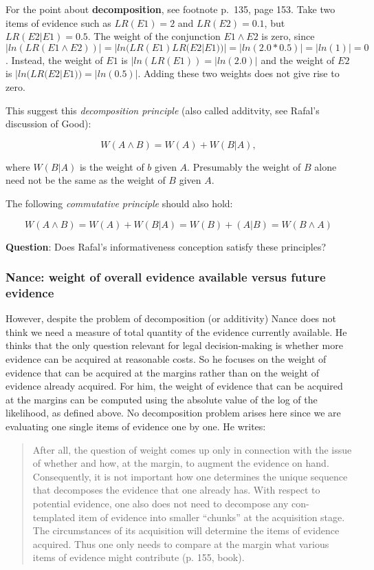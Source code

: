 \documentclass[
  10pt,
  dvipsnames,enabledeprecatedfontcommands]{scrartcl}
\begin{document}
For the point about \textbf{decomposition}, see footnote p.~135, page
153. Take two items of evidence such as \(LR(E1)=2\) and \(LR(E2)=0.1\),
but \(LR(E2 | E1)=0.5\). The weight of the conjunction \(E1 \wedge E2\)
is zero, since
\(|ln(LR(E1 \wedge E2))|=|ln(LR(E1)LR(E2| E1))|=|ln(2.0*0.5)|=|ln(1)|=0\).
Instead, the weight of \(E1\) is \(|ln(LR(E1))=|ln(2.0)|\) and the
weight of \(E2\) is \(|ln(LR(E2|E1))=|ln(0.5)|\). Adding these two
weights does not give rise to zero.

This suggest this \textit{decomposition principle} (also called
additvity, see Rafal's discussion of Good):

\[W(A \wedge B) = W(A) + W(B | A),\]

where \(W(B | A)\) is the weight of \(b\) given \(A\). Presumably the
weight of \(B\) alone need not be the same as the weight of \(B\) given
\(A\).

The following \textit{commutative principle} should also hold:

\[W(A \wedge B) = W(A) + W(B | A)= W(B) + (A | B) = W(B \wedge A)\]

\textbf{Question}: Does Rafal's informativeness conception satisfy these
principles?

\hypertarget{nance-weight-of-overall-evidence-available-versus-future-evidence}{%
\subsubsection{Nance: weight of overall evidence available versus future
evidence}\label{nance-weight-of-overall-evidence-available-versus-future-evidence}}

However, despite the problem of decomposition (or additivity) Nance does
not think we need a measure of total quantity of the evidence currently
available. He thinks that the only question relevant for legal
decision-making is whether more evidence can be acquired at reasonable
costs. So he focuses on the weight of evidence that can be acquired at
the margins rather than on the weight of evidence already acquired. For
him, the weight of evidence that can be acquired at the margins can be
computed using the absolute value of the log of the likelihood, as
defined above. No decomposition problem arises here since we are
evaluating one single items of evidence one by one. He writes:

\begin{quote}
After all, the question of weight comes up only in connection with the issue of whether and how, at the margin, to augment the evidence on hand. Consequently, it is not important how one determines the unique sequence that decomposes the evidence that one already has. With respect to potential evidence, one also does not need to decompose any con- templated item of evidence into smaller “chunks” at the acquisition stage. The circumstances of its acquisition will determine the items of evidence acquired. Thus one only needs to compare at the margin what various items of evidence might contribute (p. 155, book).
\end{quote}
\end{document}
